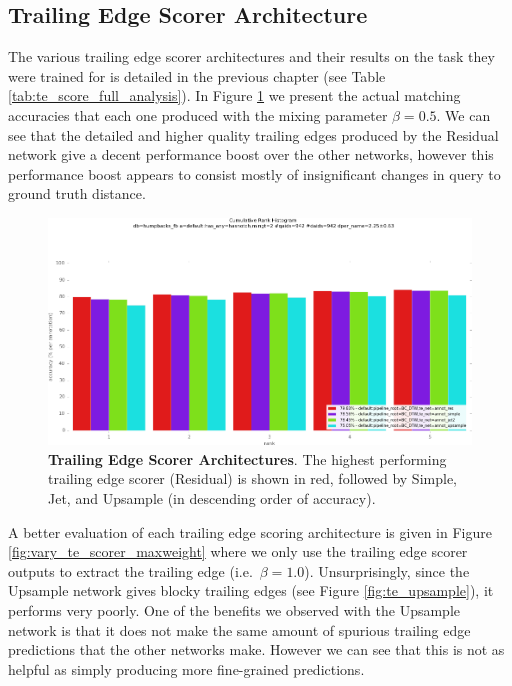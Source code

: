 \subsection{Trailing Edge Scorer Architecture}

The various trailing edge scorer architectures and their results on the task they were trained for is detailed in the previous chapter (see Table \ref{tab:te_score_full_analysis}).
In Figure \ref{fig:vary_te_scorer} we present the actual matching accuracies that each one produced with the mixing parameter $\beta = 0.5$.
We can see that the detailed and higher quality trailing edges produced by the Residual network give a decent performance boost over the other networks, however this performance boost appears to consist mostly of insignificant changes in query to ground truth distance.

\begin{figure}[t]%
\includegraphics[width=1\textwidth]{../images/results/vary_te_scorer.png}
\caption{\textbf{Trailing Edge Scorer Architectures}. The highest performing trailing edge scorer (Residual) is shown in red, followed by Simple, Jet, and Upsample (in descending order of accuracy).}
\label{fig:vary_te_scorer}
\end{figure}

A better evaluation of each trailing edge scoring architecture is given in Figure \ref{fig:vary_te_scorer_maxweight} where we only use the trailing edge scorer outputs to extract the trailing edge (i.e.\ $\beta = 1.0$).
Unsurprisingly, since the Upsample network gives blocky trailing edges (see Figure \ref{fig:te_upsample}), it performs very poorly.
One of the benefits we observed with the Upsample network is that it does not make the same amount of spurious trailing edge predictions that the other networks make.
However we can see that this is not as helpful as simply producing more fine-grained predictions.

